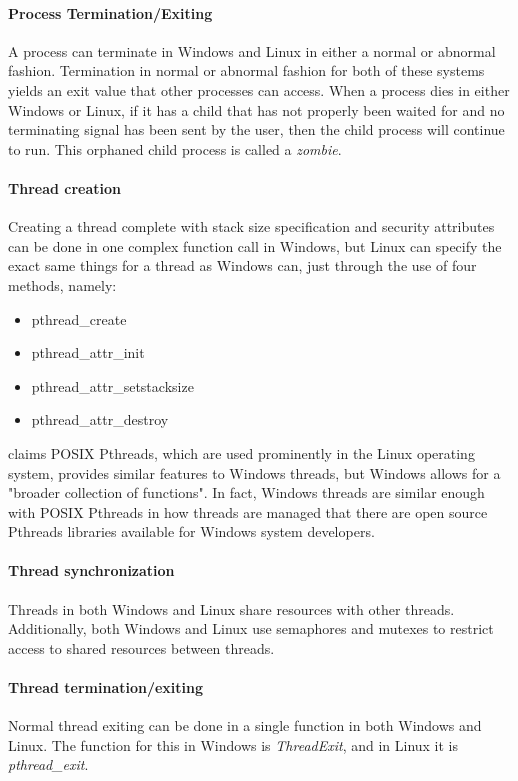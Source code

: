 \documentclass[letterpaper,10pt,titlepage]{article}
\begin{document}
\paragraph{Process Termination/Exiting}
A process can terminate in Windows and Linux in either a normal or abnormal fashion. Termination in normal or abnormal fashion for both of these systems yields an exit value that other processes can access. When a process dies in either Windows or Linux, if it has a child that has not properly been waited for and no terminating signal has been sent by the user, then the child process will continue to run. This orphaned child process is called a \emph{zombie}. 
\paragraph{Thread creation}
Creating a thread complete with stack size specification and security attributes can be done in one complex function call in Windows, but Linux can specify the exact same things for a thread as Windows can, just through the use of four methods, namely:
\begin{itemize}
\item pthread\_create
\item pthread\_attr\_init
\item pthread\_attr\_setstacksize
\item pthread\_attr\_destroy
\end{itemize}
\cite{har04} claims POSIX Pthreads, which are used prominently in the Linux operating system, provides similar features to Windows threads, but Windows allows for a "broader collection of functions". In fact, Windows threads are similar enough with POSIX Pthreads in how threads are managed that there are open source Pthreads libraries available for Windows system developers.
\paragraph{Thread synchronization}
Threads in both Windows and Linux share resources with other threads. Additionally, both Windows and Linux use semaphores and mutexes to restrict access to shared resources between threads.
\paragraph{Thread termination/exiting}
Normal thread exiting can be done in a single function in both Windows and Linux. The function for this in Windows is \emph{ThreadExit}, and in Linux it is \emph{pthread\_exit}.
\end{document}
